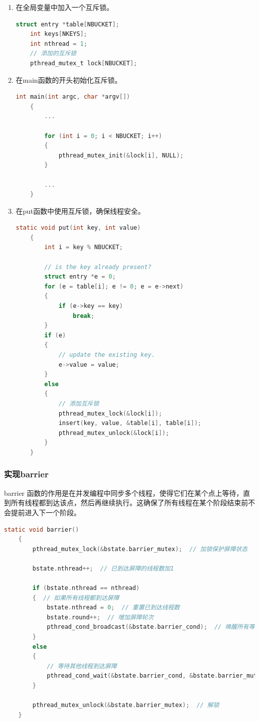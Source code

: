 \begin{enumerate}
    \item 在全局变量中加入一个互斥锁。
          \begin{lstlisting}[language=c,title=声明互斥锁]
    struct entry *table[NBUCKET];
    int keys[NKEYS];
    int nthread = 1;
    // 添加的互斥锁
    pthread_mutex_t lock[NBUCKET];
    \end{lstlisting}
    \item 在main函数的开头初始化互斥锁。
          \begin{lstlisting}[language=c,title=初始化互斥锁]
    int main(int argc, char *argv[])
    {
        ...
    
        for (int i = 0; i < NBUCKET; i++)
        {
            pthread_mutex_init(&lock[i], NULL);
        }
    
        ...
    }
    \end{lstlisting}
    \item 在put函数中使用互斥锁，确保线程安全。
          \begin{lstlisting}[language=c,title=对put函数的修改]
    static void put(int key, int value)
    {
        int i = key % NBUCKET;

        // is the key already present?
        struct entry *e = 0;
        for (e = table[i]; e != 0; e = e->next)
        {
            if (e->key == key)
                break;
        }
        if (e)
        {
            // update the existing key.
            e->value = value;
        }
        else
        {
            // 添加互斥锁
            pthread_mutex_lock(&lock[i]);
            insert(key, value, &table[i], table[i]);
            pthread_mutex_unlock(&lock[i]);
        }
    }
    \end{lstlisting}
\end{enumerate}

\subsubsection{实现barrier}
barrier 函数的作用是在并发编程中同步多个线程，使得它们在某个点上等待，直到所有线程都到达该点，然后再继续执行。这确保了所有线程在某个阶段结束前不会提前进入下一个阶段。

\begin{lstlisting}[language=c,title=对barrier函数的实现]
    static void barrier() 
    {
        pthread_mutex_lock(&bstate.barrier_mutex);  // 加锁保护屏障状态

        bstate.nthread++;  // 已到达屏障的线程数加1

        if (bstate.nthread == nthread) 
        {  // 如果所有线程都到达屏障
            bstate.nthread = 0;  // 重置已到达线程数
            bstate.round++;  // 增加屏障轮次
            pthread_cond_broadcast(&bstate.barrier_cond);  // 唤醒所有等待线程
        } 
        else 
        {
            // 等待其他线程到达屏障
            pthread_cond_wait(&bstate.barrier_cond, &bstate.barrier_mutex);  
        }

        pthread_mutex_unlock(&bstate.barrier_mutex);  // 解锁
    }

\end{lstlisting}

